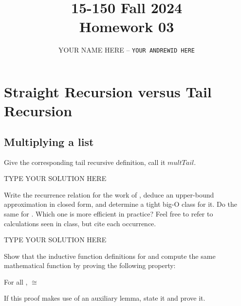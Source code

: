 \documentclass[11pt]{article}
\title{\textbf{15-150 Fall 2024\\Homework 03}}
\author{YOUR NAME HERE -- \texttt{YOUR ANDREWID HERE}}
\newcommand{\declarecommand}[1]{\providecommand{#1}{}\renewcommand{#1}}
\begin{document}
\maketitle

\declarecommand{\nil}{\mathit{nil}}
\declarecommand{\op}{mult}
\declarecommand{\opMf}[2]{#1 \times #2}
\declarecommand{\opCf}[2]{\smle{#1 * #2}}
\declarecommand{\opM}{\mathit{\op}}
\declarecommand{\opMTail}{\mathit{{\op}Tail}}
\declarecommand{\opMTailAux}{\mathit{{\op}Tail'}}
\declarecommand{\opC}{\smle{mult}}
\declarecommand{\opCTail}{\smle{multTail}}
\declarecommand{\opCTailAux}{\smle{multTail'}}
\section{Straight Recursion versus Tail Recursion}

\subsection{Multiplying a list}

\begin{task}{2} %
Give the corresponding tail recursive definition, call it
$\mathit{multTail}$.
\end{task}

\begin{solution}
TYPE YOUR SOLUTION HERE
\end{solution}


\addtocounter{taskNum}{1}
\begin{task}{3} %
Write the recurrence relation for the work of , deduce an upper-bound
approximation in closed form, and determine a tight big-O class for it.  Do
the same for .  Which one is more efficient in practice?  Feel
free to refer to calculations seen in class, but cite each occurrence.
\end{task}

\begin{solution}
TYPE YOUR SOLUTION HERE
\end{solution}


\declarecommand{\Wa}{W_{\smle{mult}}}
\declarecommand{\Wb}{W_{\smle{multTail}}}
\declarecommand{\Wc}{W_{\smle{multTail'}}}
\begin{task}{6} %
Show that the inductive function definitions for  and
 compute the same mathematical function by proving the
following property:

\begin{property}
For all ,  $\cong$ 
\end{property}

\noindent
If this proof makes use of an auxiliary lemma, state it and prove it.
\end{task}
\end{document}
